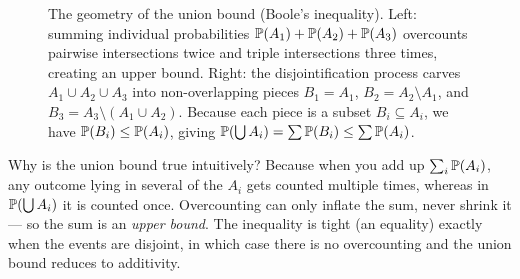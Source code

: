 \begin{figure}[H]
\caption{The geometry of the union bound (Boole's inequality). Left: summing individual probabilities $\P(A_1)+\P(A_2)+\P(A_3)$ overcounts pairwise intersections twice and triple intersections three times, creating an upper bound. Right: the disjointification process carves $A_1 \cup A_2 \cup A_3$ into non-overlapping pieces $B_1 = A_1$, $B_2 = A_2 \setminus A_1$, and $B_3 = A_3 \setminus (A_1 \cup A_2)$. Because each piece is a subset $B_i \subseteq A_i$, we have $\P(B_i) \le \P(A_i)$, giving $\P(\bigcup A_i) = \sum \P(B_i) \le \sum \P(A_i)$.}
\label{ch03:fig-union-bound}
\end{figure}

\begin{intuitionbox}
Why is the union bound true intuitively? Because when you add up
$\sum_i \P(A_i)$, any outcome lying in several of the $A_i$ gets counted multiple
times, whereas in $\P(\bigcup A_i)$ it is counted once. Overcounting can only
inflate the sum, never shrink it --- so the sum is an \emph{upper bound}. The
inequality is tight (an equality) exactly when the events are disjoint, in which
case there is no overcounting and the union bound reduces to additivity.
\end{intuitionbox}

